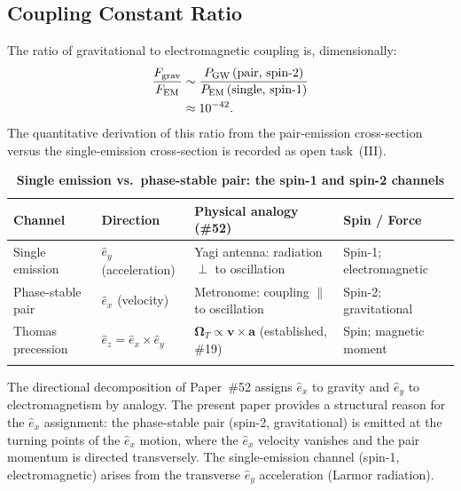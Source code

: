 \documentclass[%
 reprint, amsmath,amssymb, aps, prb, ]{revtex4-2}
\numberwithin{equation}{section}
\newcommand{\OmT}{\boldsymbol{\Omega}_T}
\newcommand{\ehat}[1]{\hat{e}_{#1}}
\begin{document}
\subsection{Coupling Constant Ratio}

The ratio of gravitational to electromagnetic coupling is, dimensionally:
\begin{align}
\frac{F_\mathrm{grav}}{F_\mathrm{EM}}
&\sim \frac{P_\mathrm{GW}\,(\text{pair, spin-2})}{P_\mathrm{EM}\,(\text{single, spin-1})}
\notag\\
&\approx 10^{-42}.
\label{eq:coupling_ratio}
\end{align}
The quantitative derivation of this ratio from the pair-emission cross-section versus the single-emission cross-section is recorded as open task~(III).

\begin{table}[t!]
\centering
\caption{\textbf{Single emission vs.\ phase-stable pair: the spin-1 and spin-2 channels}}
\label{tab:channels}
\renewcommand{\arraystretch}{1.4}
\begin{tabular}{p{3.5cm}p{3.5cm}p{4.5cm}p{3.5cm}}
\toprule
\textbf{Channel} & \textbf{Direction} & \textbf{Physical analogy (\#52)} & \textbf{Spin / Force} \\
\midrule
Single emission
& $\ehat{y}$ (acceleration)
& Yagi antenna: radiation $\perp$ to oscillation
& Spin-1; electromagnetic \\
\addlinespace[0.3cm]
Phase-stable pair
& $\ehat{x}$ (velocity)
& Metronome: coupling $\parallel$ to oscillation
& Spin-2; gravitational \\
\addlinespace[0.3cm]
Thomas precession
& $\ehat{z} = \ehat{x}\times\ehat{y}$
& $\OmT \propto \mathbf{v}\times\mathbf{a}$ (established, \#19)
& Spin; magnetic moment \\
\addlinespace[0.2cm]
\bottomrule
\end{tabular}
\vspace{0.2cm}
\begin{minipage}{0.95\textwidth}
\justifying\footnotesize
The directional decomposition of Paper~\#52 assigns $\ehat{x}$ to gravity and $\ehat{y}$ to electromagnetism by analogy. The present paper provides a structural reason for the $\ehat{x}$ assignment: the phase-stable pair (spin-2, gravitational) is emitted at the turning points of the $\ehat{x}$ motion, where the $\ehat{x}$ velocity vanishes and the pair momentum is directed transversely. The single-emission channel (spin-1, electromagnetic) arises from the transverse $\ehat{y}$ acceleration (Larmor radiation).
\end{minipage}
\end{table}
\end{document}
